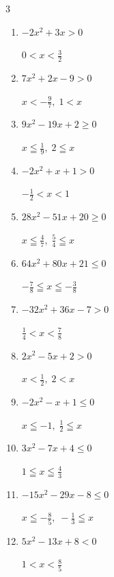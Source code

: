 \begin{multicols}{3}
\begin{enumerate}
        $\displaystyle -\frac{2}{5} \leqq x \leqq \frac{5}{7}$

  \item $-2x^{2}+3x>0$

        $\displaystyle 0 < x < \frac{3}{2}$

  \item $7x^{2}+2x-9>0$

        $\displaystyle x < -\frac{9}{7} , \; 1 < x$

  \item $9x^{2}-19x+2\geq 0$

        $\displaystyle x \leqq \frac{1}{9} , \; 2 \leqq x$

  \item $-2x^{2}+x+1>0$

        $\displaystyle -\frac{1}{2} < x < 1$

  \item $28x^{2}-51x+20\geq 0$

        $\displaystyle x \leqq \frac{4}{7} , \; \frac{5}{4} \leqq x$

\columnbreak %

\resetques

  \item $64x^{2}+80x+21\leq 0$

        $\displaystyle -\frac{7}{8} \leqq x \leqq -\frac{3}{8}$

  \item $-32x^{2}+36x-7>0$

        $\displaystyle \frac{1}{4} < x < \frac{7}{8}$

  \item $2x^{2}-5x+2>0$

        $\displaystyle x < \frac{1}{2} , \; 2 < x$

  \item $-2x^{2}-x+1\leq 0$

        $\displaystyle x \leqq -1 , \; \frac{1}{2} \leqq x$

  \item $3x^{2}-7x+4\leq 0$

        $\displaystyle 1 \leqq x \leqq \frac{4}{3}$

  \item $-15x^{2}-29x-8\leq 0$

        $\displaystyle x \leqq -\frac{8}{5} , \; -\frac{1}{3} \leqq x$

  \item $5x^{2}-13x+8<0$

        $\displaystyle 1 < x < \frac{8}{5}$


\end{enumerate}
\end{multicols}
